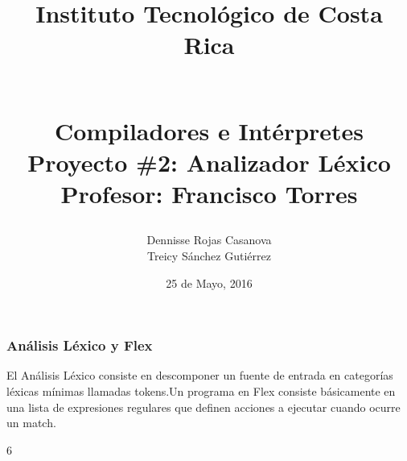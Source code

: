 \documentclass[10, usernames, dvipsnames]{beamer}
\begin{document}
 
\title{
\begin{LARGE}
Instituto Tecnol\'ogico de Costa Rica
\end{LARGE}
\newline
\begin{Large}
\\Compiladores e Int\'erpretes
\\Proyecto \#2: Analizador L\'exico
\\Profesor: Francisco Torres
\end{Large}
}
\author{Dennisse Rojas Casanova
\\Treicy S\'anchez Guti\'errez}
\date{25 de Mayo, 2016}
\maketitle 
\begin{frame} 
\frametitle{An\'alisis L\'exico y Flex} 
El An\'alisis L\'exico consiste en descomponer un fuente de entrada en categor\'ias l\'exicas m\'inimas llamadas tokens.Un programa en Flex consiste b\'asicamente en una lista de expresiones regulares que definen acciones a ejecutar cuando ocurre un match.\end{frame} 
\begin{frame}
\textcolor{BurntOrange}{6}
\end{frame}
\end{document}
